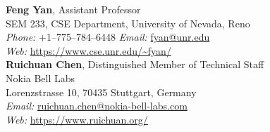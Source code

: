 \documentclass[11pt]{article}
\begin{document}
\vspace{-3mm}
\textbf{Feng Yan}, Assistant Professor \\
SEM 233, CSE Department, University of Nevada, Reno \\
\textit{Phone:} +1--775--784--6448  
\textit{Email:} \href{mailto:fyan@unr.edu}{fyan@unr.edu} \\
\textit{Web:} \url{https://www.cse.unr.edu/~fyan/} \\ 

\vspace{-3mm}
\textbf{Ruichuan Chen}, Distinguished Member of Technical Staff \\
Nokia Bell Labs \\
Lorenzstrasse 10, 70435 Stuttgart, Germany \\
\textit{Email:} \href{mailto:ruichuan.chen@nokia-bell-labs.com}{ruichuan.chen@nokia-bell-labs.com} \\
\textit{Web:} \url{https://www.ruichuan.org/} \\ 
\end{document}
